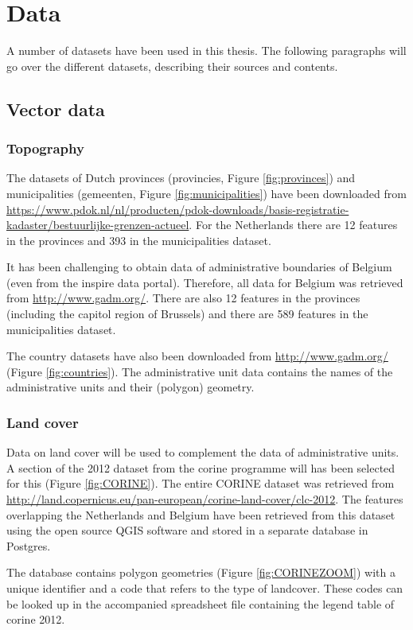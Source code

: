 

\chapter{Data}
\label{chap:data}

A number of datasets have been used in this thesis. The following paragraphs will go over the different datasets, describing their sources and contents. 

\section{Vector data}
\subsection{Topography}
\begin{sloppypar}
	The datasets of Dutch provinces (provincies, Figure \ref{fig:provinces}) and municipalities (gemeenten, Figure \ref{fig:municipalities}) have been downloaded from \url{https://www.pdok.nl/nl/producten/pdok-downloads/basis-registratie-kadaster/bestuurlijke-grenzen-actueel}. For the Netherlands there are 12 features in the provinces and 393 in the municipalities dataset. 
	
	It has been challenging to obtain data of administrative boundaries of Belgium (even from the \ac{inspire} data portal). Therefore, all data for Belgium was retrieved from \url{http://www.gadm.org/}. There are also 12 features in the provinces (including the capitol region of Brussels) and there are 589 features in the municipalities dataset.  
	
	The country datasets have also been downloaded from \url{http://www.gadm.org/} (Figure \ref{fig:countries}). The administrative unit data contains the names of the administrative units and their (polygon) geometry. 
\end{sloppypar}

\subsection{Land cover}
\begin{sloppypar}
	Data on land cover will be used to complement the data of administrative units. A section of the 2012 dataset from the \ac{corine} programme will has been selected for this (Figure \ref{fig:CORINE}). The entire CORINE dataset was retrieved from \url{http://land.copernicus.eu/pan-european/corine-land-cover/clc-2012}. The features overlapping the Netherlands and Belgium have been retrieved from this dataset using the open source QGIS software and stored in a separate database in Postgres. 
	
	The database contains polygon geometries (Figure \ref{fig:CORINEZOOM}) with a unique identifier and a code that refers to the type of landcover. These codes can be looked up in the accompanied spreadsheet file containing the legend table of \ac{corine} 2012.  	
\end{sloppypar}

